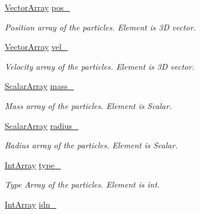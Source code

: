 \begin{DoxyCompactItemize}
\item 
\mbox{\hyperlink{class_vel_indep_particles_a27580f65b6523bfb6900520af2e44708}{Vector\+Array}} \mbox{\hyperlink{class_vel_indep_particles_aff576cd5ee9f773e84d9b7473df8f647}{pos\+\_\+}}
\begin{DoxyCompactList}\small\item\em Position array of the particles. Element is 3D vector. \end{DoxyCompactList}\item 
\mbox{\hyperlink{class_vel_indep_particles_a27580f65b6523bfb6900520af2e44708}{Vector\+Array}} \mbox{\hyperlink{class_vel_indep_particles_a48906984e10585a234f763885ce728a6}{vel\+\_\+}}
\begin{DoxyCompactList}\small\item\em Velocity array of the particles. Element is 3D vector. \end{DoxyCompactList}\item 
\mbox{\hyperlink{class_vel_indep_particles_abd6e6b0ffbbab4ebc078efd77f6a365a}{Scalar\+Array}} \mbox{\hyperlink{class_vel_indep_particles_a68671eca04638e42f30c79291f89e1e4}{mass\+\_\+}}
\begin{DoxyCompactList}\small\item\em Mass array of the particles. Element is Scalar. \end{DoxyCompactList}\item 
\mbox{\hyperlink{class_vel_indep_particles_abd6e6b0ffbbab4ebc078efd77f6a365a}{Scalar\+Array}} \mbox{\hyperlink{class_vel_indep_particles_adf3e6c9acf2f864523a5efb634275093}{radius\+\_\+}}
\begin{DoxyCompactList}\small\item\em Radius array of the particles. Element is Scalar. \end{DoxyCompactList}\item 
\mbox{\hyperlink{class_vel_indep_particles_a5e4f20d435c71a5f4179143206258a81}{Int\+Array}} \mbox{\hyperlink{class_vel_indep_particles_a97dbd52da7443243bf74de22bb8cde96}{type\+\_\+}}
\begin{DoxyCompactList}\small\item\em Type Array of the particles. Element is int. \end{DoxyCompactList}\item 
\mbox{\hyperlink{class_vel_indep_particles_a5e4f20d435c71a5f4179143206258a81}{Int\+Array}} \mbox{\hyperlink{class_vel_indep_particles_aeccde2c19380b79eb6be4f28d6077526}{idn\+\_\+}}

\end{DoxyCompactItemize}
